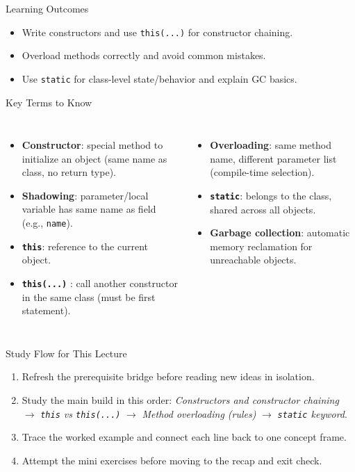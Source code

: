 \documentclass{beamer}
\begin{document}
\begin{frame}{Learning Outcomes}
  \begin{itemize}[<+->]
    \item Write constructors and use \texttt{this(...)} for constructor chaining.
    \item Overload methods correctly and avoid common mistakes.
    \item Use \texttt{static} for class-level state/behavior and explain GC basics.
  \end{itemize}
  \slidesources{\OOPSUnitIISources}
\end{frame}

\begin{frame}{Key Terms to Know}
\small
\begin{columns}[t]
\begin{itemize}
  \item \textbf{Constructor}: special method to initialize an object (same name as class, no return type).
  \item \textbf{Shadowing}: parameter/local variable has same name as field (e.g., \texttt{name}).
  \item \textbf{\texttt{this}}: reference to the current object.
  \item \textbf{\texttt{this(...)} }: call another constructor in the same class (must be first statement).
\end{itemize}
\begin{itemize}
  \item \textbf{Overloading}: same method name, different parameter list (compile-time selection).
  \item \textbf{\texttt{static}}: belongs to the class, shared across all objects.
  \item \textbf{Garbage collection}: automatic memory reclamation for unreachable objects.
\end{itemize}
\end{columns}
  \slidesources{\OOPSUnitIISources}
\end{frame}

\begin{frame}{Study Flow for This Lecture}
\begin{enumerate}[<+->]
  \item Refresh the prerequisite bridge before reading new ideas in isolation.
  \item Study the main build in this order: \textit{Constructors and constructor chaining} $\rightarrow$ \textit{\texttt{this} vs \texttt{this(...)}} $\rightarrow$ \textit{Method overloading (rules)} $\rightarrow$ \textit{\texttt{static} keyword}.
  \item Trace the worked example and connect each line back to one concept frame.
  \item Attempt the mini exercises before moving to the recap and exit check.
\end{enumerate}
  \slidesources{\OOPSUnitIISources}
\end{frame}
\end{document}
